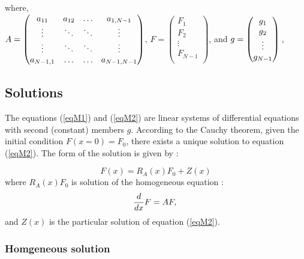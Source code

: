 \documentclass[a4paper,12pt]{article}
\begin{document}
where, \\
$\\ A=\begin{pmatrix}
a_{11} & a_{12} & \ldots & a_{1,N-1} \\
\vdots & \ddots & \ddots & \vdots  \\
\vdots & \ddots & \ddots & \vdots  \\
a_{N-1,1} & \ldots & \ldots & a_{N-1,N-1}
\end{pmatrix}$,  $F=\begin{pmatrix}
 F_1 \\ 
 F_2 \\
 \vdots\\
 F_{N-1} \\ \end{pmatrix}$,  and $g=\begin{pmatrix}
 g_1 \\ 
 g_2 \\
 \vdots\\
 g_{N-1} \\ \end{pmatrix}\\$,\\
 
 \subsection{Solutions}
 The equations  (\ref{eqM1}) and (\ref{eqM2}) are linear systems of differential equations with second (constant) members $g$. According to the Cauchy theorem, given the initial condition $F(x=0)=F_0$, there exists a unique solution to equation (\ref{eqM2}). The form of the solution is given by :
 
 
 \begin{equation}
F(x) = R_A(x)F_0 + Z(x)
\end{equation}
where $R_A(x)F_0$ is solution of the homogeneous equation : 
 \begin{equation}
\frac{d}{dx}F=AF , \\
\label{eqhomogen}
\end{equation}
 and $Z(x)$ is the particular solution of equation (\ref{eqM2}).
 \subsubsection{Homgeneous solution}
\end{document}
